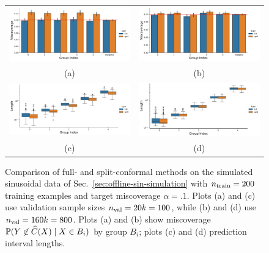\documentclass{article}
\begin{document}
\begin{figure}
  \begin{center}
    \begin{tabular}{cc}
      \hspace{-.5cm}
      \includegraphics[width=.5\columnwidth]{Images/group_miscoverage_ratio_40}
      &
      \hspace{-.25cm}
      \includegraphics[width=.5\columnwidth]{Images/group_miscoverage_ratio_160} \\
      (a) & (b) \\
      \hspace{-.5cm}
      \includegraphics[width=.5\columnwidth]{Images/group_length_ratio_40} &
      \hspace{-.25cm}
      \includegraphics[width=.5\columnwidth]{Images/group_length_ratio_160} \\
      (c) & (d)
    \end{tabular}
    \caption{
      \label{fig:little-silly-experiment}
      Comparison of full- and split-conformal
      methods on the simulated sinusoidal data of
      Sec.~\ref{sec:offline-sin-simulation} with
      $n_{\textup{train}} = 200$ training examples and target
      miscoverage $\alpha = .1$.
      Plots (a) and (c) use validation
      sample sizes $n_{\textup{val}} = 20 k = 100$,
      while (b) and (d) use
      $n_{\textup{val}} = 160 k = 800$. Plots (a) and
      (b) show miscoverage $\mathbb{P}(Y \not \in \widehat{C}(X) \mid X \in B_i)$ by
      group $B_i$; plots (c) and (d) prediction interval lengths.
    }
  \end{center}
\end{figure}
\end{document}
